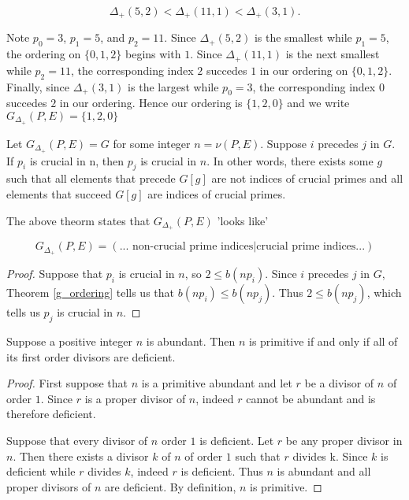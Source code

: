 \documentclass[../paper.tex]{subfiles}
\begin{document}
$$\Delta_{+}(5,2) < \Delta_{+}(11,1) < \Delta_{+}(3,1).$$

Note $p_0 = 3$, $p_1 = 5$, and $p_2 = 11$. Since $\Delta_+(5,2)$
is the smallest while $p_1 = 5$, the ordering on $\{0, 1, 2\}$
begins with $1$. Since $\Delta_+(11,1)$ is the next smallest while
$p_2 = 11$, the corresponding index $2$ succedes $1$ in our
ordering on $\{0,1,2\}$. Finally, since $\Delta_+(3,1)$ is the largest
while $p_0 = 3$, the corresponding index $0$ succedes $2$ in our
ordering. Hence our ordering is $\{1, 2, 0\}$ and we write 
$G_{\Delta_+}(P,E) = \{1, 2, 0\}$ 

\begin{theorem}\label{crucial_thm}
Let $G_{\Delta_+}(P,E) = G$ for some integer $n = \nu (P,E)$.
Suppose $i$ precedes $j$ in $G$. If $p_i$ is crucial in n,
then $p_j$ is crucial in $n$. In other words, there exists some $g$
such that all elements that precede $G[g]$ are not indices of
crucial primes and all elements that succeed $G[g]$ are indices of
crucial primes.
\end{theorem}

The above theorm states that $G_{\Delta_+}(P,E)$ 'looks like'

$$ G_{\Delta_+}(P, E) = (\text{... non-crucial prime indices} 
                        | \text{crucial prime indices...}) $$

\begin{proof}

Suppose that
$p_i$ is crucial in $n$, so $2 \leq b(n p_i)$. Since $i$ precedes 
$j$ in $G$, Theorem {\ref{g_ordering}} tells us that $b(n p_i) \leq b(n
p_j)$. Thus $2 \leq b(n p_j)$, which tells us $p_j$ is crucial in $n$.

\end{proof}


\begin{theorem}\label{del_minus_thm}
Suppose a positive integer $n$ is abundant. Then $n$ is primitive if and 
only if all of its first order divisors are deficient.
\end{theorem}

\begin{proof}
	First suppose that $n$ is a primitive abundant and let $r$ be a
divisor of $n$ of order $1$. Since $r$ is a proper divisor of $n$,
indeed $r$ cannot be abundant and is therefore deficient.

	Suppose that every divisor of $n$ order $1$ is deficient. Let 
$r$ be any proper divisor in $n$. Then there exists a divisor $k$ 
of $n$ of order $1$ such that $r$ divides k. Since $k$ is 
deficient while $r$ divides $k$, indeed $r$ is deficient. Thus $n$
is abundant and all proper divisors of $n$ are deficient. By 
definition, $n$ is primitive. 
\end{proof}
\end{document}
